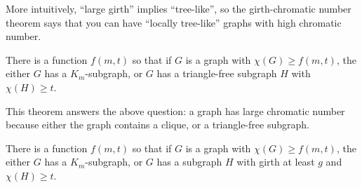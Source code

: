 \documentclass[main.tex]{subfiles}
\begin{document}
More intuitively, ``large girth'' implies ``tree-like'',
so the girth-chromatic number theorem says that you can have
``locally tree-like'' graphs with high chromatic number.

\begin{theorem}[Rodl 1977]
  There is a function $f(m,t)$ so that if $G$ is a graph with
  $\chi(G)\geq f(m,t)$, the either $G$ has a $K_m$-subgraph,
  or $G$ has a triangle-free subgraph $H$ with $\chi(H)\geq t$.
\end{theorem}

This theorem answers the above question: a graph has large chromatic number
because either the graph contains a clique, or a triangle-free subgraph.

\begin{conjecture}
  There is a function $f(m,t)$ so that if $G$ is a graph with
  $\chi(G)\geq f(m,t)$, the either $G$ has a $K_m$-subgraph,
  or $G$ has a subgraph $H$ with girth at least $g$ and $\chi(H)\geq t$.
\end{conjecture}
\end{document}
